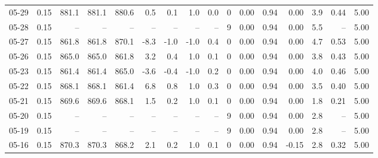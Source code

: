 \begin{threeparttable}
{\begin{tabular}{lrrrrrrrrrrrrrrr}
  05-29 &     0.15 & 881.1 & 881.1 & 880.6 &        0.5 &            0.1 &                      1.0 &                 0.0 &              0 &       0.00 &      0.94 &           0.00 &              3.9 &            0.44 &                   5.00 \\
  05-28 &     0.15 &    -- &    -- &    -- &         -- &             -- &                       -- &                  -- &              9 &       0.00 &      0.94 &           0.00 &              5.5 &              -- &                   5.00 \\
  05-27 &     0.15 & 861.8 & 861.8 & 870.1 &       -8.3 &           -1.0 &                     -1.0 &                 0.4 &              0 &       0.00 &      0.94 &           0.00 &              4.7 &            0.53 &                   5.00 \\
  05-26 &     0.15 & 865.0 & 865.0 & 861.8 &        3.2 &            0.4 &                      1.0 &                 0.1 &              0 &       0.00 &      0.94 &           0.00 &              3.8 &            0.43 &                   5.00 \\
  05-23 &     0.15 & 861.4 & 861.4 & 865.0 &       -3.6 &           -0.4 &                     -1.0 &                 0.2 &              0 &       0.00 &      0.94 &           0.00 &              4.0 &            0.46 &                   5.00 \\
  05-22 &     0.15 & 868.1 & 868.1 & 861.4 &        6.8 &            0.8 &                      1.0 &                 0.3 &              0 &       0.00 &      0.94 &           0.00 &              3.5 &            0.40 &                   5.00 \\
  05-21 &     0.15 & 869.6 & 869.6 & 868.1 &        1.5 &            0.2 &                      1.0 &                 0.1 &              0 &       0.00 &      0.94 &           0.00 &              1.8 &            0.21 &                   5.00 \\
  05-20 &     0.15 &    -- &    -- &    -- &         -- &             -- &                       -- &                  -- &              9 &       0.00 &      0.94 &           0.00 &              2.8 &              -- &                   5.00 \\
  05-19 &     0.15 &    -- &    -- &    -- &         -- &             -- &                       -- &                  -- &              9 &       0.00 &      0.94 &           0.00 &              2.8 &              -- &                   5.00 \\
  05-16 &     0.15 & 870.3 & 870.3 & 868.2 &        2.1 &            0.2 &                      1.0 &                 0.1 &              0 &       0.00 &      0.94 &          -0.15 &              2.8 &            0.32 &                   5.00 \\

\end{tabular}}
\end{threeparttable}

